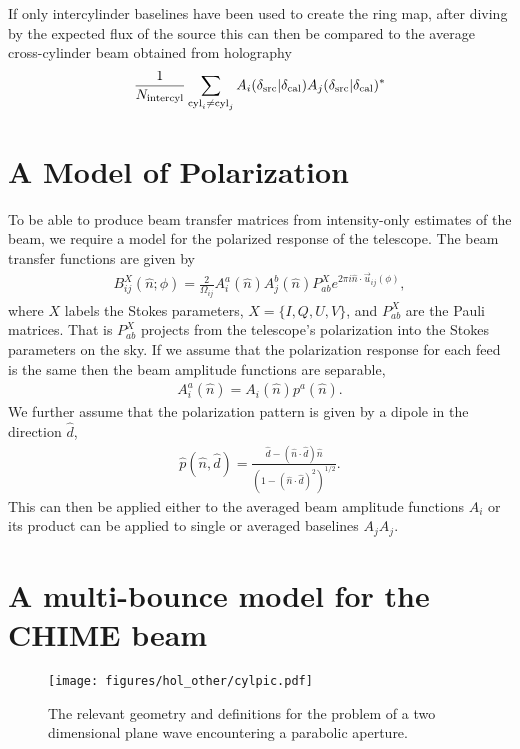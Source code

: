 If only intercylinder baselines have been used to create the ring map, after diving by the expected flux of the source this can then be compared to the average cross-cylinder beam obtained from holography
\begin{equation}
\frac{1}{N_{\rm intercyl}}\sum_{{\rm cyl}_i \ne{\rm cyl}_j}  A_i(\delta_{\rm src} | \delta_{\rm cal})A_j(\delta_{\rm src} | \delta_{\rm cal})^*
\end{equation}

\section{A Model of Polarization}
\label{app:hol:sec:polmodel}

To be able to produce beam transfer matrices from intensity-only estimates of the beam, we require a model for the polarized response of the telescope. The beam transfer functions are given by
\begin{align}
B^X_{ij}(\hat{n}; \phi) = \frac{2}{\Omega_{ij}} A^a_i(\hat{n}) A^b_j(\hat{n}) P_{ab}^X e^{2\pi i \hat{n}\cdot\vec{u}_{ij}(\phi)},
\end{align}
where $X$ labels the Stokes parameters, $X=\{I, Q, U, V\}$, and $P_{ab}^X$ are the Pauli matrices. That is $P_{ab}^X$ projects from the telescope's polarization into the Stokes parameters on the sky. If we assume that the polarization response for each feed is the same then the beam amplitude functions are separable,
\begin{align}
A^a_i(\hat{n}) = A_i(\hat{n})p^a(\hat{n}).
\end{align}
We further assume that the polarization pattern is given by a dipole in the direction $\hat{d}$,
\begin{align}
\hat{p}(\hat{n}, \hat{d}) =\frac{\hat{d} - (\hat{n}\cdot\hat{d}) \hat{n}}{(1 - (\hat{n}\cdot\hat{d})^2)^{1/2}}.
\end{align}
This can then be applied either to the averaged beam amplitude functions $A_i$  or its product can be applied to single or averaged baselines $A_jA_j$.

\section{A multi-bounce model for the CHIME beam}
\label{app:hol:sec:model}

\begin{figure}[h!]
\begin{center}
\texttt{[image: figures/hol\_other/cylpic.pdf]}
\caption{The relevant geometry and definitions for the problem of a two dimensional plane wave encountering a parabolic aperture.}
\end{center}
\label{cylpic}
\end{figure}

